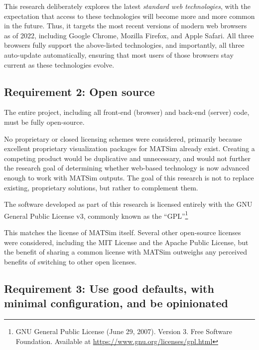 This research deliberately explores the latest \emph{standard web technologies}, with the expectation that access to these technologies will become more and more common in the future. Thus, it targets the most recent versions of modern web browsers as of 2022, including Google Chrome, Mozilla Firefox, and Apple Safari. All three browsers fully support the above-listed technologies, and importantly, all three auto-update automatically, ensuring that most users of those browsers stay current as these technologies evolve.

\hypertarget{requirement-2-open-source}{%
\subsection{Requirement 2: Open
source}\label{requirement-2-open-source}}

The entire project, including all front-end (browser) and back-end (server) code, must be fully open-source.

No proprietary or closed licensing schemes were considered, primarily because excellent proprietary visualization packages for MATSim already exist. Creating a competing product would be duplicative and unnecessary, and would not further the research goal of determining whether web-based technology is now advanced enough to work with MATSim outputs. The goal of this research is not to replace existing, proprietary solutions, but rather to complement them.

The software developed as part of this research is licensed entirely with the GNU General Public License v3, commonly known as the ``GPL''\footnote{GNU General Public License (June 29, 2007). Version 3. Free Software Foundation. Available at \url{https://www.gnu.org/licenses/gpl.html}}

This matches the license of MATSim itself. Several other open-source licenses were considered, including the MIT License and the Apache Public License, but the benefit of sharing a common license with MATSim outweighs any perceived benefits of switching to other open licenses.

\hypertarget{requirement-3-use-good-defaults-with-minimal-configuration-and-be-opinionated}{%
\subsection{Requirement 3: Use good defaults, with minimal configuration, and be opinionated}\label{requirement-3-use-good-defaults-with-minimal-configuration-and-be-opinionated}}

